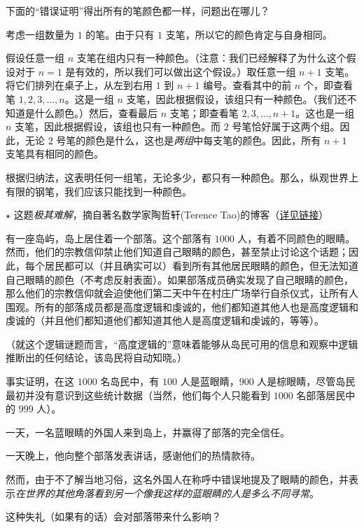 \clearpage

\begin{exercise}
    下面的``错误证明''得出所有的笔颜色都一样，问题出在哪儿？
    \begin{spoof}
        考虑一组数量为 $1$ 的笔。由于只有 $1$ 支笔，所以它的颜色肯定与自身相同。

        假设任意一组 $n$ 支笔在组内只有一种颜色。（注意：我们已经解释了为什么这个假设对于 $n = 1$ 是有效的，所以我们可以做出这个假设。）取任意一组 $n + 1$ 支笔。将它们排列在桌子上，从左到右用 $1$ 到 $n + 1$ 编号。查看其中的前 $n$ 个，即查看笔 $1,2,3, \dots , n$。这是一组 $n$ 支笔，因此根据假设，该组只有一种颜色。（我们还不知道是什么颜色。）然后，查看最后 $n$ 支笔；即查看笔 $2,3, \dots ,n+1$。这也是一组 $n$ 支笔，因此根据假设，该组也只有一种颜色。而 $2$ 号笔恰好属于这两个组。因此，无论 $2$ 号笔的颜色是什么，这也是\textit{两组}中每支笔的颜色。因此，所有 $n+1$ 支笔具有相同的颜色。

        根据归纳法，这表明任何一组笔，无论多少，都只有一种颜色。那么，纵观世界上有限的钢笔，我们应该只能找到一种颜色。
    \end{spoof}
\end{exercise}

\begin{exercise}
    $\star$ 这题\textit{极其难解}，摘自著名数学家陶哲轩(Terence Tao)的博客（\href{https://terrytao.wordpress.com/2011/04/07/the-blue-eyed-islanders-puzzle-repost/}{详见链接}）

    有一座岛屿，岛上居住着一个部落。这个部落有 $1000$ 人，有着不同颜色的眼睛。然而，他们的宗教信仰禁止他们知道自己眼睛的颜色，甚至禁止讨论这个话题；因此，每个居民都可以（并且确实可以）看到所有其他居民眼睛的颜色，但无法知道自己眼睛的颜色（不考虑反射表面）。如果部落成员确实发现了自己眼睛的颜色，那么他们的宗教信仰就会迫使他们第二天中午在村庄广场举行自杀仪式，让所有人围观。所有的部落成员都是高度逻辑和虔诚的，他们都知道其他人也是高度逻辑和虔诚的（并且他们都知道他们都知道其他人是高度逻辑和虔诚的，等等）。

    （就这个逻辑谜题而言，``高度逻辑的''意味着能够从岛民可用的信息和观察中逻辑推断出的任何结论，该岛民将自动知晓。）

    事实证明，在这 $1000$ 名岛民中，有 $100$ 人是蓝眼睛，$900$ 人是棕眼睛，尽管岛民最初并没有意识到这些统计数据（当然，他们每个人只能看到 $1000$ 名部落居民中的 $999$ 人）。

    一天，一名蓝眼睛的外国人来到岛上，并赢得了部落的完全信任。

    一天晚上，他向整个部落发表讲话，感谢他们的热情款待。

    然而，由于不了解当地习俗，这名外国人在称呼中错误地提及了眼睛的颜色，并表示\textit{在世界的其他角落看到另一个像我这样的蓝眼睛的人是多么不同寻常}。

    这种失礼（如果有的话）会对部落带来什么影响？
\end{exercise}